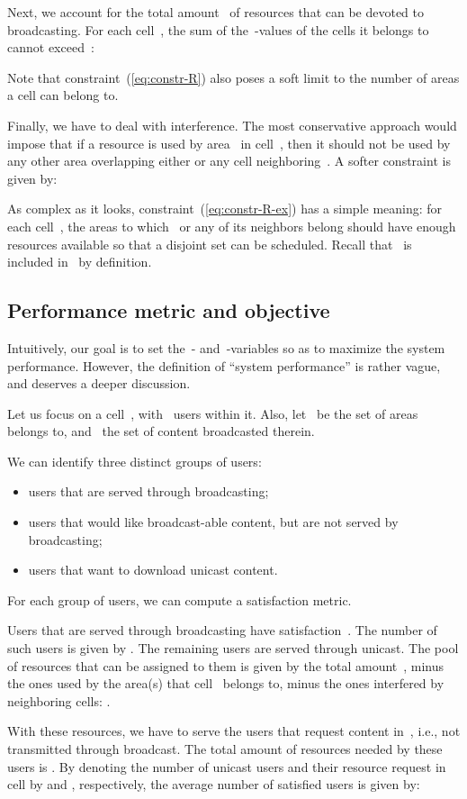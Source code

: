 \documentclass[10pt, conference, compsocconf]{IEEEtran}
\numberwithin{equation}{section}
\begin{document}
Next, we account for 
the total amount~ of resources that can be devoted to broadcasting. For each cell~, the sum of the~-values of the cells
it belongs to cannot exceed~:

Note that constraint~(\ref{eq:constr-R}) also poses a soft limit to the number of areas a cell can belong to.

Finally, we have to deal with interference. The most conservative approach would impose that if a resource
is used by area~ in cell~, then it should not be used by any other area overlapping either 
or any cell neighboring~. A softer constraint is given by:

As complex as it looks, constraint~(\ref{eq:constr-R-ex}) has a simple meaning: for each cell~, the areas to
which~ or any of its neighbors belong should have enough resources
available so that a disjoint set can be scheduled. Recall that~ is
included in~ by definition.

\subsection{Performance metric and objective}

Intuitively, our goal is to set the~- and~-variables so as to maximize the system performance.
However, the definition of ``system performance'' is rather vague, and deserves a deeper discussion.

Let us focus on a cell~, with~ users within it. Also, let~ be the
set of areas~ belongs to, and~ the set of content broadcasted therein.

We can identify three distinct groups of users:
\begin{itemize}
\item users that are served through broadcasting;
\item users that would like broadcast-able content, but are not served by broadcasting;
\item users that want to download unicast content.
\end{itemize}
For each group of users, we can compute a satisfaction metric.

Users that are served through broadcasting have satisfaction~. The number of such users is given by .
The remaining users are served through unicast. The pool of resources that can be assigned to them is
given by the total amount~, minus the ones used by the area(s) that cell~ belongs to, minus the ones
interfered by neighboring cells: .


With these resources, we have to serve the users that request content in~, i.e.,
not transmitted through broadcast.
The total amount of resources needed by these users is .
By denoting the number of unicast users and their resource request in
cell  by
 and , respectively, the 
average number of satisfied users is given by:
\end{document}
